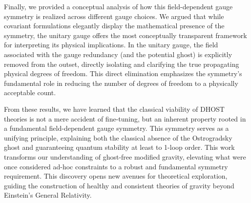 \documentclass[twocolumn]{aastex631}
\begin{document}
Finally, we provided a conceptual analysis of how this field-dependent gauge symmetry is realized across different gauge choices. We argued that while covariant formulations elegantly display the mathematical presence of the symmetry, the unitary gauge offers the most conceptually transparent framework for interpreting its physical implications. In the unitary gauge, the field associated with the gauge redundancy (and the potential ghost) is explicitly removed from the outset, directly isolating and clarifying the true propagating physical degrees of freedom. This direct elimination emphasizes the symmetry's fundamental role in reducing the number of degrees of freedom to a physically acceptable count.

From these results, we have learned that the classical viability of DHOST theories is not a mere accident of fine-tuning, but an inherent property rooted in a fundamental field-dependent gauge symmetry. This symmetry serves as a unifying principle, explaining both the classical absence of the Ostrogradsky ghost and guaranteeing quantum stability at least to 1-loop order. This work transforms our understanding of ghost-free modified gravity, elevating what were once considered ad-hoc constraints to a robust and fundamental symmetry requirement. This discovery opens new avenues for theoretical exploration, guiding the construction of healthy and consistent theories of gravity beyond Einstein's General Relativity.

{}

\end{document}
